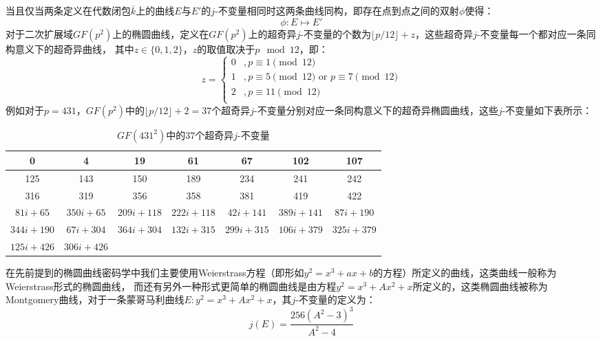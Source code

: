 \documentclass{book}
\numberwithin{equation}{subsubsection}
\begin{document}
当且仅当两条定义在代数闭包$\overline{k}$上的曲线$E$与$E'$的$j$-不变量相同时这两条曲线同构，即存在点到点之间的双射$\phi$使得：
\begin{equation}
    \phi:E\mapsto E'
    \nonumber
\end{equation}
对于二次扩展域$GF(p^2)$上的椭圆曲线，定义在$GF(p^2)$上的超奇异$j$-不变量的个数为$\lfloor p/12\rfloor+z$，这些超奇异$j$-不变量每一个都对应一条同构意义下的超奇异曲线，
其中$z\in\{0,1,2\}$，$z$的取值取决于$p\mod 12$，即：
\begin{equation}
    z=\begin{cases}
        0&,p\equiv1\pmod{12}\\
        1&,p\equiv5\pmod{12} \text{ or } p\equiv7\pmod{12}\\
        2&,p\equiv11\pmod{12}\\
    \end{cases}
    \nonumber
\end{equation}
例如对于$p=431$，$GF(p^2)$中的$\lfloor p/12\rfloor+2=37$个超奇异$j$-不变量分别对应一条同构意义下的超奇异椭圆曲线，这些$j$-不变量如下表所示：
\begin{table}[!h]
    \centering
    \caption{$GF(431^2)$中的$37$个超奇异$j$-不变量}
    \begin{tabular}{|c|c|c|c|c|c|c|}
        \hline
        0 & 4 & 19 & 61 & 67 & 102 & 107 \\
        \hline
        125 & 143 & 150 & 189 & 234 & 241 & 242 \\
        \hline
        316 & 319 & 356 & 358 & 381 & 419 & 422 \\
        \hline
        $81i + 65$ & $350i + 65$ & $209i + 118$ & $222i + 118$ & $42i + 141$ & $389i + 141$ & $87i + 190$ \\
        \hline
        $344i + 190$ & $67i + 304$ & $364i + 304$ & $132i + 315$ & $299i + 315$ & $106i + 379$ & $325i + 379$ \\
        \hline
        $125i + 426$ & $306i + 426$ &&&&&\\
        \hline
    \end{tabular}
\end{table}\par
在先前提到的椭圆曲线密码学中我们主要使用Weierstrass方程（即形如$y^2 = x^3 + ax + b$的方程）所定义的曲线，这类曲线一般称为Weierstrass形式的椭圆曲线，
而还有另外一种形式更简单的椭圆曲线是由方程$y^2=x^3+Ax^2+x$所定义的，这类椭圆曲线被称为Montgomery曲线，对于一条蒙哥马利曲线$E:y^2=x^3+Ax^2+x$，其$j$-不变量的定义为：
\begin{equation}
    j(E)=\frac{256(A^2-3)^3}{A^2-4}
    \nonumber
\end{equation}
\end{document}
